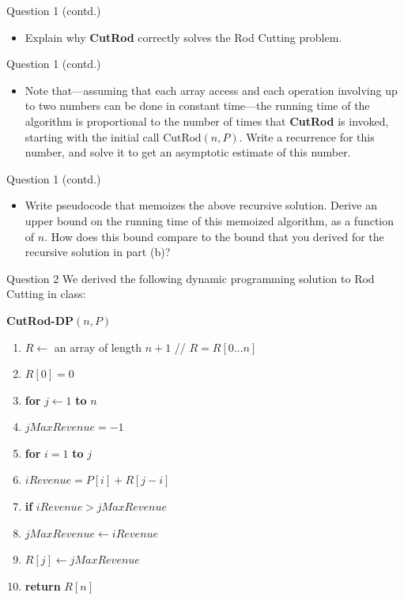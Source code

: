\documentclass{beamer}
\begin{document}
\begin{frame}{Question 1 (contd.)}
\begin{itemize}
  \item[(a)] Explain why \textbf{CutRod} correctly solves the Rod Cutting problem.
\end{itemize}
\end{frame}
\begin{frame}{Question 1 (contd.)}
\begin{itemize}
  \item[(b)] Note that---assuming that each array access and each operation involving up to two numbers can be done in constant time---the running time of the algorithm is proportional to the number of times that \textbf{CutRod} is invoked, starting with the initial call $\text{CutRod}(n, P)$. Write a recurrence for this number, and solve it to get an asymptotic estimate of this number.
\end{itemize}
\end{frame}
\begin{frame}{Question 1 (contd.)}
\begin{itemize}
  \item[(c)] Write pseudocode that memoizes the above recursive solution. Derive an upper bound on the running time of this memoized algorithm, as a function of $n$. How does this bound compare to the bound that you derived for the recursive solution in part (b)?
\end{itemize}
\end{frame}

\begin{frame}{Question 2}
We derived the following dynamic programming solution to Rod Cutting in class:

\medskip
\textbf{CutRod-DP}$(n, P)$
\begin{enumerate}
  \item[\textbf{1}] $R \leftarrow$ an array of length $n+1$ \quad // $R = R[0\ldots n]$
  \item[\textbf{2}] $R[0] = 0$
  \item[\textbf{3}] \textbf{for} $j \leftarrow 1$ \textbf{to} $n$
  \item[\textbf{4}] \quad $jMaxRevenue = -1$
  \item[\textbf{5}] \quad \textbf{for} $i = 1$ \textbf{to} $j$
  \item[\textbf{6}] \quad\quad $iRevenue = P[i] + R[j-i]$
  \item[\textbf{7}] \quad\quad \textbf{if} $iRevenue > jMaxRevenue$
  \item[\textbf{8}] \quad\quad\quad $jMaxRevenue \leftarrow iRevenue$
  \item[\textbf{9}] \quad $R[j] \leftarrow jMaxRevenue$
  \item[\textbf{10}] \textbf{return} $R[n]$
\end{enumerate}
\end{frame}
\end{document}
